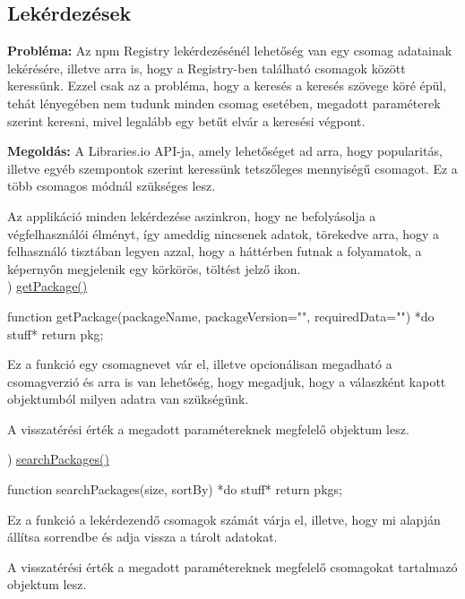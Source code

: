 \pagebreak

\subsection{Lekérdezések}

\textbf{Probléma:} Az npm Registry lekérdezésénél lehetőség van egy csomag adatainak lekérésére, illetve arra is, hogy a Registry-ben található csomagok között keressünk. Ezzel csak az a probléma, hogy a keresés a keresés szövege köré épül, tehát lényegében nem tudunk minden csomag esetében, megadott paraméterek szerint keresni, mivel legalább egy betűt elvár a keresési végpont.

\textbf{Megoldás:} A Libraries.io API-ja, amely lehetőséget ad arra, hogy popularitás, illetve egyéb szempontok szerint keressünk tetszőleges mennyiségű csomagot. Ez a több csomagos módnál szükséges lesz.

Az applikáció minden lekérdezése aszinkron, hogy ne befolyásolja a végfelhasználói élményt, így ameddig nincsenek adatok, törekedve arra, hogy a felhasználó tisztában legyen azzal, hogy a háttérben futnak a folyamatok, a képernyőn megjelenik egy körkörös, töltést jelző ikon.\\

) \underline{getPackage()}\\

\begin{cpp}
function getPackage(packageName, packageVersion="", requiredData=""){
	*do stuff*
	return pkg;
}
\end{cpp}

Ez a funkció egy csomagnevet vár el, illetve opcionálisan megadható a csomagverzió és arra is van lehetőség, hogy megadjuk, hogy a válaszként kapott objektumból milyen adatra van szükségünk.

A visszatérési érték a megadott paramétereknek megfelelő objektum lesz.

) \underline{searchPackages()}\\

\begin{cpp}
function searchPackages(size, sortBy){
	*do stuff*
	return pkgs;
}
\end{cpp}

Ez a funkció a lekérdezendő csomagok számát várja el, illetve, hogy mi alapján állítsa sorrendbe és adja vissza a tárolt adatokat.

A visszatérési érték a megadott paramétereknek megfelelő csomagokat tartalmazó objektum lesz.

